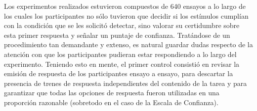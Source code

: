 Los experimentos realizados estuvieron compuestos de 640 ensayos a lo largo de los cuales los participantes no sólo tuvieron que decidir si los estímulos cumplían con la condición que se les solicitó detectar, sino valorar su certidumbre sobre esta primer respuesta y señalar un puntaje de confianza. Tratándose de un procedimiento tan demandante y extenso, es natural guardar dudas respecto de la atención con que los participantes pudieran estar respondiendo a lo largo del experimento. Teniendo esto en mente, el primer control consistió en revisar la emisión de respuesta de los participantes ensayo a ensayo, para descartar la presencia de trenes de respuesta independientes del contenido de la tarea y para garantizar que todas las opciones de respuesta fueron utilizadas en una proporción razonable (sobretodo en el caso de la Escala de Confianza).

